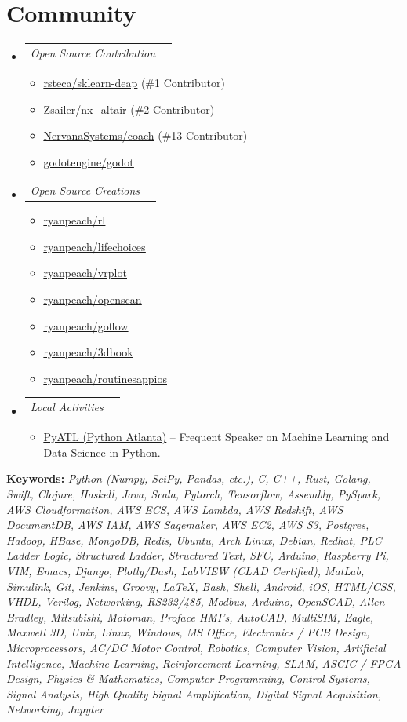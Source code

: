\documentclass[letterpaper,11pt]{article}
\makeatletter
\newcommand{\resumeItem}[1]{
  \item\small{
    {#1 \vspace{-2pt}}
  }
}
\newcommand{\resumeSubSubheading}[2]{
    \item
    \begin{tabular*}{0.97\textwidth}{l@{\extracolsep{\fill}}r}
      \textit{\small#1} & \textit{\small #2} \\
    \end{tabular*}\vspace{-7pt}
}
\newcommand{\resumeSubHeadingListStart}{\begin{itemize}[leftmargin=0.15in, label={}]}
\newcommand{\resumeSubHeadingListEnd}{\end{itemize}}
\newcommand{\resumeItemListStart}{\begin{itemize}}
\newcommand{\resumeItemListEnd}{\end{itemize}\vspace{-5pt}}
\makeatother
\begin{document}
 \section{Community}
   \resumeSubHeadingListStart
   \resumeSubSubheading
   {Open Source Contribution}{}
   \resumeItemListStart
     \resumeItem{\href{https://github.com/rsteca/sklearn-deap}{\underline{rsteca/sklearn-deap}}
     (\#1 Contributor)}
     \resumeItem{\href{https://github.com/Zsailer/nx_altair}{\underline{Zsailer/nx\_altair}}
     (\#2 Contributor)}
     \resumeItem{\href{https://github.com/NervanaSystems/coach}{\underline{NervanaSystems/coach}}
     (\#13 Contributor)}
     \resumeItem{\href{https://github.com/godotengine/godot}{\underline{godotengine/godot}}}
   \resumeItemListEnd
   \resumeSubSubheading
   {Open Source Creations}{}
   \resumeItemListStart
     \resumeItem{\href{https://github.com/ryanpeach/rl}{\underline{ryanpeach/rl}}}
     \resumeItem{\href{https://github.com/ryanpeach/lifechoices}{\underline{ryanpeach/lifechoices}}}
     \resumeItem{\href{https://github.com/ryanpeach/vrplot}{\underline{ryanpeach/vrplot}}}
     \resumeItem{\href{https://github.com/ryanpeach/openscan}{\underline{ryanpeach/openscan}}}
     \resumeItem{\href{https://github.com/ryanpeach/goflow}{\underline{ryanpeach/goflow}}}
     \resumeItem{\href{https://github.com/ryanpeach/3dbook}{\underline{ryanpeach/3dbook}}}
     \resumeItem{\href{https://github.com/ryanpeach/routinesappios}{\underline{ryanpeach/routinesappios}}}
   \resumeItemListEnd
   \resumeSubSubheading
   {Local Activities}{}
   \resumeItemListStart
     \resumeItem{\href{https://www.meetup.com/python-atlanta/}{\underline{PyATL
           (Python Atlanta)}} -- Frequent Speaker on Machine Learning and Data Science in Python.}
   \resumeItemListEnd
   \resumeSubHeadingListEnd


   \vspace*{\fill}
   \begin{center}
   \tiny{\bf Keywords:}
\tiny{\it Python (Numpy, SciPy, Pandas, etc.), C, C++, Rust, Golang, Swift, Clojure,
  Haskell, Java, Scala, Pytorch, Tensorflow, Assembly, PySpark, AWS
  Cloudformation, AWS ECS, AWS Lambda, AWS Redshift, AWS DocumentDB, AWS IAM, AWS Sagemaker, AWS
  EC2, AWS S3, Postgres, Hadoop, HBase, MongoDB, Redis, Ubuntu, Arch Linux, Debian,
  Redhat, PLC Ladder Logic, Structured Ladder, Structured Text, SFC, Arduino,
  Raspberry Pi, VIM, Emacs,
  Django, Plotly/Dash, LabVIEW (CLAD Certified), MatLab, Simulink, Git, Jenkins,
  Groovy, LaTeX, Bash, Shell, Android, iOS, HTML/CSS, VHDL, Verilog, Networking,
  RS232/485, Modbus, Arduino, OpenSCAD, Allen-Bradley, Mitsubishi, Motoman,
  Proface HMI's, AutoCAD, MultiSIM, Eagle, Maxwell 3D, Unix, Linux, Windows, MS
  Office, Electronics / PCB Design, Microprocessors, AC/DC Motor Control,
  Robotics, Computer Vision, Artificial Intelligence, Machine Learning,
  Reinforcement Learning, SLAM, ASCIC / FPGA Design, Physics \& Mathematics,
  Computer Programming, Control Systems, Signal Analysis, High Quality Signal
  Amplification, Digital Signal Acquisition, Networking, Jupyter}
\end{center}
\end{document}
